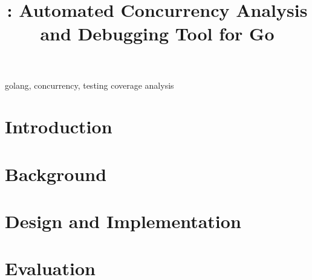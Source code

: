 \documentclass[conference]{IEEEtran}
\begin{document}
\title{\goat: Automated Concurrency Analysis and Debugging Tool for Go}



\maketitle

\begin{abstract}

\end{abstract}

\begin{IEEEkeywords}
golang, concurrency, testing coverage analysis
\end{IEEEkeywords}


%

\section{Introduction}
\label{sec:intro}



\section{Background}
\label{sec:bg}


\section{Design and Implementation}
\label{sec:design}


\section{Evaluation}
\label{sec:evaluation}

\end{document}
